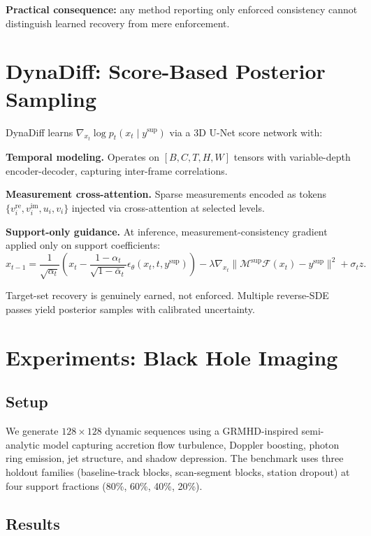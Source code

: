 \documentclass[11pt]{article}
\begin{document}
\textbf{Practical consequence:} any method reporting only enforced consistency cannot distinguish learned recovery from mere enforcement.

\section{DynaDiff: Score-Based Posterior Sampling}\label{sec:method}

DynaDiff learns $\nabla_{x_t}\log p_t(x_t \mid y^{\mathrm{sup}})$ via a 3D U-Net score network with:

\textbf{Temporal modeling.} Operates on $[B, C, T, H, W]$ tensors with variable-depth encoder-decoder, capturing inter-frame correlations.

\textbf{Measurement cross-attention.} Sparse measurements encoded as tokens $\{v_i^{\mathrm{re}}, v_i^{\mathrm{im}}, u_i, v_i\}$ injected via cross-attention at selected levels.

\textbf{Support-only guidance.} At inference, measurement-consistency gradient applied only on support coefficients:
\begin{equation}
x_{t-1} = \frac{1}{\sqrt{\alpha_t}}\left(x_t - \frac{1-\alpha_t}{\sqrt{1-\bar{\alpha}_t}}\epsilon_\theta(x_t, t, y^{\mathrm{sup}})\right) - \lambda\nabla_{x_t}\|\mathcal{M}^{\mathrm{sup}}\mathcal{F}(x_t) - y^{\mathrm{sup}}\|^2 + \sigma_t z.
\end{equation}

Target-set recovery is genuinely earned, not enforced. Multiple reverse-SDE passes yield posterior samples with calibrated uncertainty.

\section{Experiments: Black Hole Imaging}\label{sec:experiments}

\subsection{Setup}

We generate $128\times128$ dynamic sequences using a GRMHD-inspired semi-analytic model capturing accretion flow turbulence, Doppler boosting, photon ring emission, jet structure, and shadow depression. The benchmark uses three holdout families (baseline-track blocks, scan-segment blocks, station dropout) at four support fractions (80\%, 60\%, 40\%, 20\%).

\subsection{Results}
\end{document}
